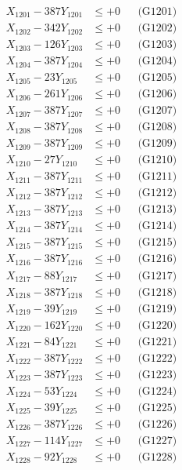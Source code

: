 \documentclass[a4paper,10pt]{article}
\begin{document}
{\begin{align}
\allowbreak
X_{1201} - 387Y_{1201} &\leq +0 && \text{(G1201)} \\
X_{1202} - 342Y_{1202} &\leq +0 && \text{(G1202)} \\
X_{1203} - 126Y_{1203} &\leq +0 && \text{(G1203)} \\
X_{1204} - 387Y_{1204} &\leq +0 && \text{(G1204)} \\
X_{1205} - 23Y_{1205} &\leq +0 && \text{(G1205)} \\
X_{1206} - 261Y_{1206} &\leq +0 && \text{(G1206)} \\
X_{1207} - 387Y_{1207} &\leq +0 && \text{(G1207)} \\
X_{1208} - 387Y_{1208} &\leq +0 && \text{(G1208)} \\
X_{1209} - 387Y_{1209} &\leq +0 && \text{(G1209)} \\
X_{1210} - 27Y_{1210} &\leq +0 && \text{(G1210)} \\
\allowbreak
X_{1211} - 387Y_{1211} &\leq +0 && \text{(G1211)} \\
X_{1212} - 387Y_{1212} &\leq +0 && \text{(G1212)} \\
X_{1213} - 387Y_{1213} &\leq +0 && \text{(G1213)} \\
X_{1214} - 387Y_{1214} &\leq +0 && \text{(G1214)} \\
X_{1215} - 387Y_{1215} &\leq +0 && \text{(G1215)} \\
X_{1216} - 387Y_{1216} &\leq +0 && \text{(G1216)} \\
X_{1217} - 88Y_{1217} &\leq +0 && \text{(G1217)} \\
X_{1218} - 387Y_{1218} &\leq +0 && \text{(G1218)} \\
X_{1219} - 39Y_{1219} &\leq +0 && \text{(G1219)} \\
X_{1220} - 162Y_{1220} &\leq +0 && \text{(G1220)} \\
\allowbreak
X_{1221} - 84Y_{1221} &\leq +0 && \text{(G1221)} \\
X_{1222} - 387Y_{1222} &\leq +0 && \text{(G1222)} \\
X_{1223} - 387Y_{1223} &\leq +0 && \text{(G1223)} \\
X_{1224} - 53Y_{1224} &\leq +0 && \text{(G1224)} \\
X_{1225} - 39Y_{1225} &\leq +0 && \text{(G1225)} \\
X_{1226} - 387Y_{1226} &\leq +0 && \text{(G1226)} \\
X_{1227} - 114Y_{1227} &\leq +0 && \text{(G1227)} \\
X_{1228} - 92Y_{1228} &\leq +0 && \text{(G1228)} \\

\end{align}}
\end{document}
